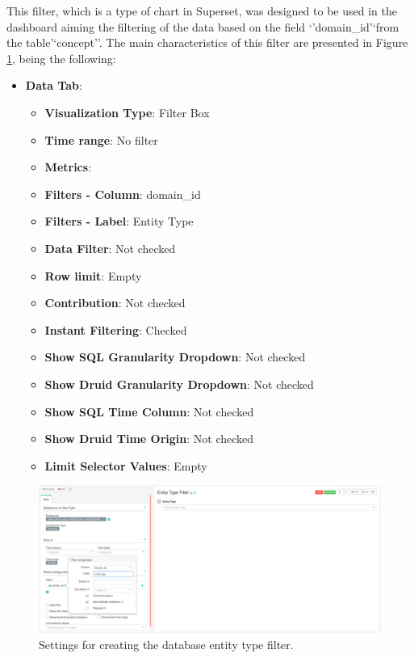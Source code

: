 \documentclass[]{book}
\providecommand{\tightlist}{%
  \setlength{\itemsep}{0pt}\setlength{\parskip}{0pt}}
\begin{document}
This filter, which is a type of chart in Superset, was designed to be
used in the dashboard aiming the filtering of the data based on the
field `'domain\_id'`from the table'`concept''. The main characteristics
of this filter are presented in Figure \ref{fig:entityTypeFilter}, being
the following:

\begin{itemize}
\tightlist
\item
  \textbf{Data Tab}:

  \begin{itemize}
  \tightlist
  \item
    \textbf{Visualization Type}: Filter Box
  \item
    \textbf{Time range}: No filter
  \item
    \textbf{Metrics}:
  \item
    \textbf{Filters - Column}: domain\_id
  \item
    \textbf{Filters - Label}: Entity Type
  \item
    \textbf{Data Filter}: Not checked
  \item
    \textbf{Row limit}: Empty
  \item
    \textbf{Contribution}: Not checked
  \item
    \textbf{Instant Filtering}: Checked
  \item
    \textbf{Show SQL Granularity Dropdown}: Not checked
  \item
    \textbf{Show Druid Granularity Dropdown}: Not checked
  \item
    \textbf{Show SQL Time Column}: Not checked
  \item
    \textbf{Show Druid Time Origin}: Not checked
  \item
    \textbf{Limit Selector Values}: Empty
  \end{itemize}
\end{itemize}

\begin{figure}
\includegraphics[width=1\linewidth]{images/entityTypeFilter} \caption{Settings for creating the database entity type filter.}\label{fig:entityTypeFilter}
\end{figure}
\end{document}
